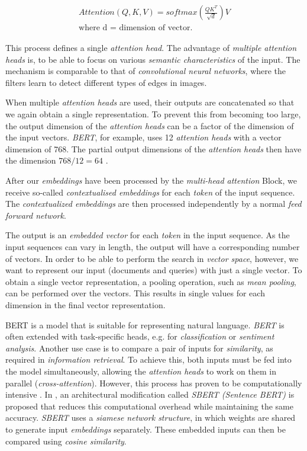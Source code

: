 \documentclass{article}
\begin{document}
\begin{align}
\begin{split}
	Attention(Q,K,V) = softmax(\frac{QK^{T}}{\sqrt{d}})V \\
    \text{where d = dimension of vector.}
\end{split}
\label{attentionFormula}
\end{align}

This process defines a single \textit{attention head}. The advantage of \textit{multiple attention heads} is, to be able to focus on various \textit{semantic characteristics} of the input. The mechanism is comparable to that of \textit{convolutional neural networks}, where the filters learn to detect different types of edges in images. 

When multiple \textit{attention heads} are used, their outputs are concatenated so that we again obtain a single representation. To prevent this from becoming too large, the output dimension of the \textit{attention heads} can be a factor of the dimension of the input vectors. \textit{BERT}, for example, uses 12 \textit{attention heads} with a vector dimension of 768. The partial output dimensions of the \textit{attention heads} then have the dimension $768/12 = 64$ \cite{attentionIsAllYouNeed}.

After our \textit{embeddings} have been processed by the \textit{multi-head attention} Block, we receive so-called \textit{contextualised embeddings} for each \textit{token} of the input sequence. The \textit{contextualized embeddings} are then processed independently by a normal \textit{feed forward network}. 

The output is an \textit{embedded vector} for each \textit{token} in the input sequence. As the input sequences can vary in length, the output will have a corresponding number of vectors. In order to be able to perform the search in \textit{vector space}, however, we want to represent our input (documents and queries) with just a single vector. To obtain a single vector representation, a pooling operation, such as \textit{mean pooling}, can be performed over the vectors. This results in single values for each dimension in the final vector representation.

BERT is a model that is suitable for representing natural language. \textit{BERT} is often extended with task-specific heads, e.g. for \textit{classification} or \textit{sentiment analysis}. Another use case is to compare a pair of inputs for \textit{similarity}, as required in \textit{information retrieval}. To achieve this, both inputs must be fed into the model simultaneously, allowing the \textit{attention heads} to work on them in parallel (\textit{cross-attention}). However, this process has proven to be computationally intensive \cite{sentenceBert}. In \cite{sentenceBert}, an architectural modification called \textit{SBERT (Sentence BERT)} is proposed that reduces this computational overhead while maintaining the same accuracy. \textit{SBERT} uses a \textit{siamese network structure}, in which weights are shared to generate input \textit{embeddings} separately. These embedded inputs can then be compared using \textit{cosine similarity}.
\end{document}
